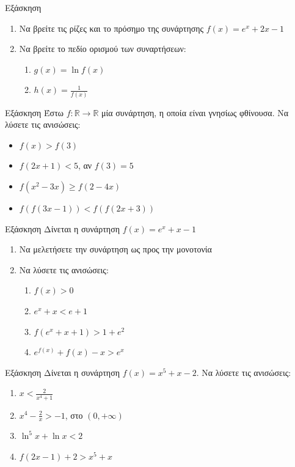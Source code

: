 \documentclass[greek]{beamer}
\begin{document}
\begin{frame}{Εξάσκηση}
 \begin{enumerate}
  \item Να βρείτε τις ρίζες και το πρόσημο της συνάρτησης $f(x)=e^x+2x-1$ \pause
  \item Να βρείτε το πεδίο ορισμού των συναρτήσεων:
        \begin{enumerate}
         \item $g(x)=\ln f(x)$ \pause
         \item $h(x)=\frac{1}{f(x)}$
        \end{enumerate}
 \end{enumerate}
\end{frame}

\begin{frame}{Εξάσκηση}
 Έστω $f:\mathbb{R}\to\mathbb{R}$ μία συνάρτηση, η οποία είναι γνησίως φθίνουσα. Να λύσετε τις ανισώσεις:
 \begin{itemize}
  \item $f(x)>f(3)$
  \item $f(2x+1)<5$, αν $f(3)=5$
  \item $f(x^2-3x)\ge f(2-4x)$
  \item $f\left(f(3x-1)\right)<f\left(f(2x+3)\right)$
 \end{itemize}
\end{frame}

\begin{frame}{Εξάσκηση}
 Δίνεται η συνάρτηση $f(x)=e^x+x-1$
 \begin{enumerate}
  \item Να μελετήσετε την συνάρτηση ως προς την μονοτονία \pause
  \item Να λύσετε τις ανισώσεις:
        \begin{enumerate}
         \item $f(x)>0$ \pause
         \item $e^x+x<e+1$ \pause
         \item $f(e^x+x+1)>1+e^2$ \pause
         \item $e^{f(x)}+f(x)-x>e^x$
        \end{enumerate}
 \end{enumerate}
\end{frame}

\begin{frame}{Εξάσκηση}
 Δίνεται η συνάρτηση $f(x)=x^5+x-2$. Να λύσετε τις ανισώσεις:
 \begin{enumerate}
  \item $x<\frac{2}{x^4+1}$ \pause
  \item $x^4-\frac{2}{x}>-1$, στο $(0,+\infty)$ \pause
  \item $\ln^5 x+\ln x<2$ \pause
  \item $f(2x-1)+2>x^5+x$
 \end{enumerate}
\end{frame}
\end{document}
